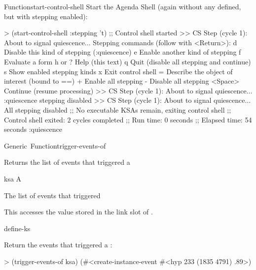 \documentclass[10pt,twoside,english,pdftex]{article}
\begin{document}
\begin{functiondoc}{Function}{start-control-shell}
Start the Agenda Shell (again without any  defined, but with
stepping enabled):
\begin{example}
> (start-control-shell :stepping 't)
;; Control shell started
>> CS Step (cycle 1):
   About to signal quiescence... 
Stepping commands (follow with <Return>):
   d       Disable this kind of stepping (:quiescence)
   e       Enable another kind of stepping
   f       Evaluate a form
   h or ?  Help (this text)
   q       Quit (disable all stepping and continue)
   s       Show enabled stepping kinds
   x       Exit control shell
   =       Describe the object of interest (bound to ==)
   +       Enable all stepping
   -       Disable all stepping
   <Space> Continue (resume processing)
>> CS Step (cycle 1):
   About to signal quiescence... 
:quiescence stepping disabled
>> CS Step (cycle 1):
   About to signal quiescence... 
All stepping disabled
;; No executable KSAs remain, exiting control shell
;; Control shell exited: 2 cycles completed
;; Run time: 0 seconds
;; Elapsed time: 54 seconds
:quiescence
\end{example}

%
\fnnote \pollingnote

\end{functiondoc}


\begin{functiondoc}{Generic~Function}{trigger-events-of}{ 
    \returns{} }
%
%

\fnsyntax

\fnpurpose Returns the list of events that triggered a 

\fnmethods
{}

\fnpackage {}

\fnmodule {}

\fnargs
\begin{args}{ksa}
\arg[ksa] A 
\end{args}

\fnreturns The list of events that triggered 
  
\fndescription 
This  accesses the value stored in the
 link slot of .

\begin{alsos}{define-ks}
\also[define-ks]
\also[ks]
\also[ksa]
\end{alsos}

\fnexample
Return the events that triggered a :
\begin{example}
> (trigger-events-of ksa)
(#<create-instance-event #<hyp 233 (1835 4791) .89>)
\end{example}

\end{functiondoc}
\end{document}
